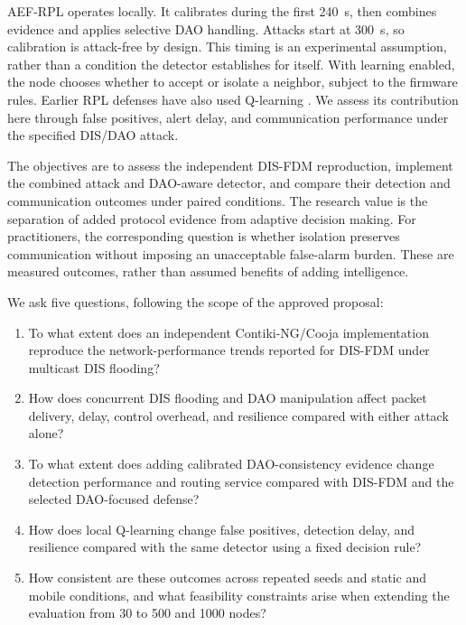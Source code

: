 \documentclass[journal]{IEEEtran}
\begin{document}
AEF-RPL operates locally. It calibrates during the first 240~s, then combines evidence and applies selective DAO handling. Attacks start at 300~s, so calibration is attack-free by design. This timing is an experimental assumption, rather than a condition the detector establishes for itself. With learning enabled, the node chooses whether to accept or isolate a neighbor, subject to the firmware rules. Earlier RPL defenses have also used Q-learning \cite{qsecrpl2023,itrpl2024}. We assess its contribution here through false positives, alert delay, and communication performance under the specified DIS/DAO attack.

The objectives are to assess the independent DIS-FDM reproduction, implement the combined attack and DAO-aware detector, and compare their detection and communication outcomes under paired conditions. The research value is the separation of added protocol evidence from adaptive decision making. For practitioners, the corresponding question is whether isolation preserves communication without imposing an unacceptable false-alarm burden. These are measured outcomes, rather than assumed benefits of adding intelligence.

We ask five questions, following the scope of the approved proposal:
\begin{enumerate}
\item[\emph{RQ1:}] To what extent does an independent Contiki-NG/Cooja implementation reproduce the network-performance trends reported for DIS-FDM under multicast DIS flooding?
\item[\emph{RQ2:}] How does concurrent DIS flooding and DAO manipulation affect packet delivery, delay, control overhead, and resilience compared with either attack alone?
\item[\emph{RQ3:}] To what extent does adding calibrated DAO-consistency evidence change detection performance and routing service compared with DIS-FDM and the selected DAO-focused defense?
\item[\emph{RQ4:}] How does local Q-learning change false positives, detection delay, and resilience compared with the same detector using a fixed decision rule?
\item[\emph{RQ5:}] How consistent are these outcomes across repeated seeds and static and mobile conditions, and what feasibility constraints arise when extending the evaluation from 30 to 500 and 1000 nodes?
\end{enumerate}
\end{document}

